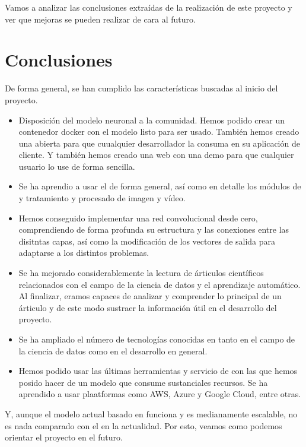 
Vamos a analizar las conclusiones extraídas de la realización de este proyecto y ver que mejoras se pueden realizar de cara al futuro.

\section{Conclusiones}

De forma general, se han cumplido las características buscadas al inicio del proyecto.
\begin{itemize}
  \item Disposición del modelo neuronal a la comunidad. Hemos podido crear un contenedor docker con el modelo listo para ser usado. También hemos creado una  abierta para que cuualquier desarrollador la consuma en su aplicación de cliente. Y también hemos creado una web con una demo para que cualquier usuario lo use de forma sencilla.
  \item Se ha aprendio a usar el   de forma general, así como en detalle los módulos de  y tratamiento y procesado de imagen y vídeo.
  \item Hemos conseguido implementar una red convolucional desde cero, comprendiendo de forma profunda su estructura y las conexiones entre las disitntas capas, así como la modificación de los vectores de salida para adaptarse a los distintos problemas.
  \item Se ha mejorado considerablemente la lectura de árticulos científicos relacionados con el campo de la ciencia de datos y el aprendizaje automático. Al finalizar, eramos capaces de analizar y comprender lo principal de un árticulo y de este modo sustraer la información útil en el desarrollo del proyecto.
  \item Se ha ampliado el número de tecnologías conocidas en tanto en el campo de la ciencia de datos como en el desarrollo  en general.
  \item Hemos podido usar las últimas herramientas y servicio de  con las que hemos posido hacer  de un modelo que consume sustanciales recursos. Se ha aprendido a usar plaatformas como AWS, Azure y Google Cloud, entre otras.
\end{itemize}

Y, aunque el modelo actual basado en  funciona  y es medianamente escalable, no es nada comparado con el    en la actualidad. Por esto, veamos como podemos orientar el proyecto en el futuro.

